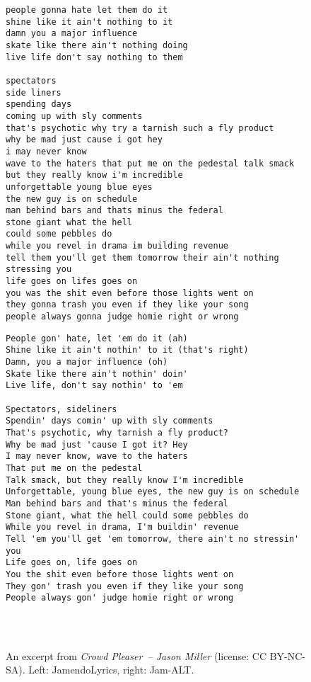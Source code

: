 \documentclass{article}
\begin{document}
\begin{figure}
\centering
    \begin{minipage}[t]{0.51\linewidth}
\begin{lstlisting}
people gonna hate let them do it
shine like it ain't nothing to it
damn you a major influence
skate like there ain't nothing doing
live life don't say nothing to them

spectators
side liners
spending days
coming up with sly comments
that's psychotic why try a tarnish such a fly product
why be mad just cause i got hey
i may never know
wave to the haters that put me on the pedestal talk smack
but they really know i'm incredible
unforgettable young blue eyes
the new guy is on schedule
man behind bars and thats minus the federal
stone giant what the hell
could some pebbles do
while you revel in drama im building revenue
tell them you'll get them tomorrow their ain't nothing stressing you
life goes on lifes goes on
you was the shit even before those lights went on
they gonna trash you even if they like your song
people always gonna judge homie right or wrong
\end{lstlisting}
    \end{minipage}
    \hfill
    \begin{minipage}[t]{0.46\linewidth}
\begin{lstlisting}
People gon' hate, let 'em do it (ah)
Shine like it ain't nothin' to it (that's right)
Damn, you a major influence (oh)
Skate like there ain't nothin' doin'
Live life, don't say nothin' to 'em

Spectators, sideliners
Spendin' days comin' up with sly comments
That's psychotic, why tarnish a fly product?
Why be mad just 'cause I got it? Hey
I may never know, wave to the haters
That put me on the pedestal
Talk smack, but they really know I'm incredible
Unforgettable, young blue eyes, the new guy is on schedule
Man behind bars and that's minus the federal
Stone giant, what the hell could some pebbles do
While you revel in drama, I'm buildin' revenue
Tell 'em you'll get 'em tomorrow, there ain't no stressin' you
Life goes on, life goes on
You the shit even before those lights went on
They gon' trash you even if they like your song
People always gon' judge homie right or wrong




\end{lstlisting}
    \end{minipage}
    \caption{An excerpt from \emph{Crowd Pleaser~-- Jason Miller} (license: CC BY-NC-SA). Left: JamendoLyrics, right: Jam-ALT. }
    \label{fig:lyrics-ex-1}
\end{figure}
\end{document}
